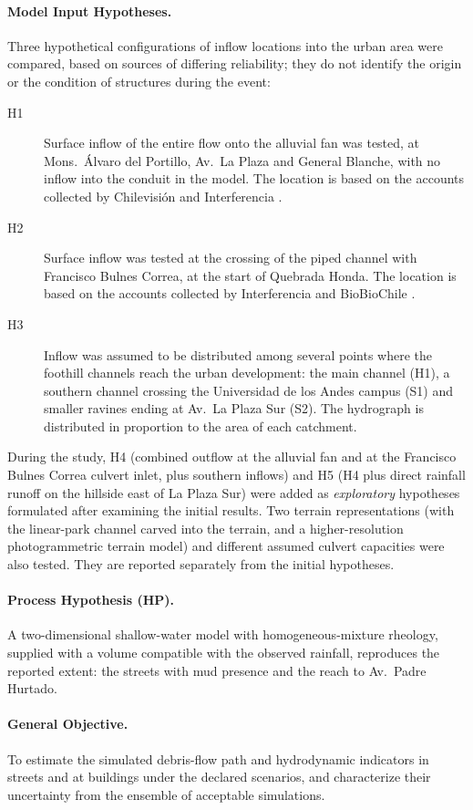 \paragraph{Model Input Hypotheses.} Three hypothetical configurations of inflow locations into the urban area were compared, based on sources of differing reliability; they do not identify the origin or the condition of structures during the event:
\begin{description}
\item[H1] Surface inflow of the entire flow onto the alluvial fan was tested, at Mons.\ Álvaro del Portillo, Av.\ La Plaza and General Blanche, with no inflow into the conduit in the model. The location is based on the accounts collected by Chilevisión and Interferencia \citep{chilevision2026,interferencia2026}.
\item[H2] Surface inflow was tested at the crossing of the piped channel with Francisco Bulnes Correa, at the start of Quebrada Honda. The location is based on the accounts collected by Interferencia and BioBioChile \citep{interferencia2026,biobio2026origen}.
\item[H3] Inflow was assumed to be distributed among several points where the foothill channels reach the urban development: the main channel (H1), a southern channel crossing the Universidad de los Andes campus (S1) and smaller ravines ending at Av.\ La Plaza Sur (S2). The hydrograph is distributed in proportion to the area of each catchment.
\end{description}
During the study, H4 (combined outflow at the alluvial fan and at the Francisco Bulnes Correa culvert inlet, plus southern inflows) and H5 (H4 plus direct rainfall runoff on the hillside east of La Plaza Sur) were added as \emph{exploratory} hypotheses formulated after examining the initial results. Two terrain representations (with the linear-park channel carved into the terrain, and a higher-resolution photogrammetric terrain model) and different assumed culvert capacities were also tested. They are reported separately from the initial hypotheses.
\paragraph{Process Hypothesis (HP).} A two-dimensional shallow-water model with homogeneous-mixture rheology, supplied with a volume compatible with the observed rainfall, reproduces the reported extent: the streets with mud presence and the reach to Av.\ Padre Hurtado.

\paragraph{General Objective.} To estimate the simulated debris-flow path and hydrodynamic indicators in streets and at buildings under the declared scenarios, and characterize their uncertainty from the ensemble of acceptable simulations.

